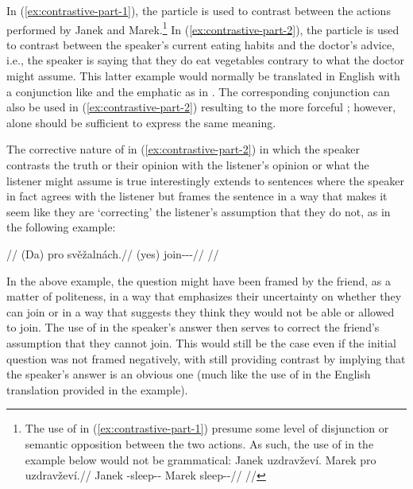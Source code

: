 In (\ref{ex:contrastive-part-1}), the particle  is used to contrast
between the actions performed by Janek and Marek.\footnote{The use of 
in (\ref{ex:contrastive-part-1}) presume some level of disjunction or semantic
opposition between the two actions. As such, the use of  in the example
below would not be grammatical:
\ex[lingstyle=fnex,belowexskip=-1em,aboveglftskip=1pt]
\begingl
	\gla \ljudge{*}Janek uzdravževí. Marek pro uzdravževí.//
	\glb Janek \Refl{}-sleep-\Av{}-\Cont{} Marek \Cntr{} sleep-\Av{}-\Cont{}//
	\glft {}//
\endgl
\xe
} In (\ref{ex:contrastive-part-2}), the particle  is used to contrast
between the speaker's current eating habits and the doctor's advice, i.e., the
speaker is saying that they do eat vegetables contrary to what the doctor might
assume. This latter example would normally be translated in English with a
conjunction like  and the emphatic  as in . The corresponding conjunction  can also be used in
(\ref{ex:contrastive-part-2}) resulting to the more forceful ; however,  alone should be
sufficient to express the same meaning.

The corrective nature of  in (\ref{ex:contrastive-part-2}) in which the
speaker contrasts the truth or their opinion with the listener's opinion or what
the listener might assume is true interestingly extends to sentences where the
speaker in fact agrees with the listener but frames the sentence in a way that
makes it seem like they are `correcting' the listener's assumption that they do
not, as in the following example:

\pex
\begingl
	\glpreamble {}//
	\gla (Da) pro svěžalnách.//
	\glb (yes) \Cntr{} join-\Av{}-\Pot{}-\Ctp{}//
	\glft {}//
\endgl
\xe

In the above example, the question might have been framed by the friend, as a
matter of politeness, in a way that emphasizes their uncertainty on whether they
can join or in a way that suggests they think they would not be able or allowed
to join. The use of  in the speaker's answer then serves to correct the
friend's assumption that they cannot join. This would still be the case even if
the initial question was not framed negatively, with  still providing
contrast by implying that the speaker's answer is an obvious one (much like the
use of  in the English translation provided in the example).

